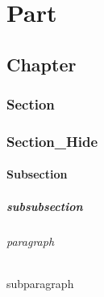 \documentclass{book}
\begin{document}
\setcounter{tocdepth}{6} %
\tableofcontents %
\listoffigures
\listoftables %

\part{Part}
\chapter{Chapter}
\section{Section}
\section{Section\_Hide} %
\subsection{Subsection}
\subsubsection{subsubsection}
\paragraph{paragraph}
\subparagraph{subparagraph}
\end{document}
